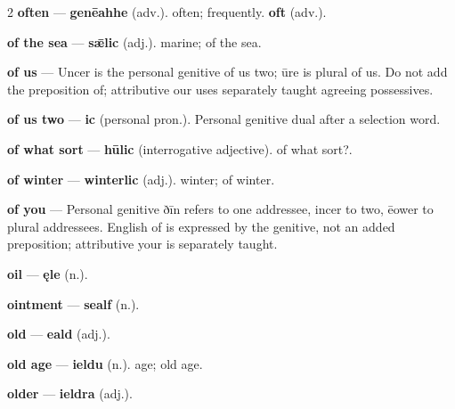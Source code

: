 \begin{multicols}{2}
\textbf{often} — \textbf{genēahhe} (adv.). often; frequently. \textbf{oft} (adv.).\par
\textbf{of the sea} — \textbf{sǣlic} (adj.). marine; of the sea.\par
\textbf{of us} — Uncer is the personal genitive of us two; ūre is plural of us. Do not add the preposition of; attributive our uses separately taught agreeing possessives.\par
\textbf{of us two} — \textbf{ic} (personal pron.). Personal genitive dual after a selection word.\par
\textbf{of what sort} — \textbf{hūlic} (interrogative adjective). of what sort?.\par
\textbf{of winter} — \textbf{winterlic} (adj.). winter; of winter.\par
\textbf{of you} — Personal genitive ðīn refers to one addressee, incer to two, ēower to plural addressees. English of is expressed by the genitive, not an added preposition; attributive your is separately taught.\par
\textbf{oil} — \textbf{ęle} (n.).\par
\textbf{ointment} — \textbf{sealf} (n.).\par
\textbf{old} — \textbf{eald} (adj.).\par
\textbf{old age} — \textbf{ieldu} (n.). age; old age.\par
\textbf{older} — \textbf{ieldra} (adj.).\par

\end{multicols}
